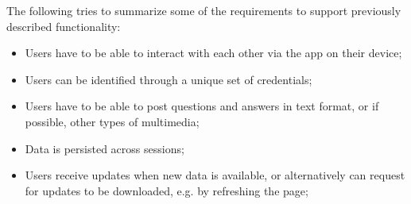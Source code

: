 The following tries to summarize some of the requirements to support previously described functionality:

\begin{itemize}
	\item Users have to be able to interact with each other via the app on their device;
	\item	Users can be identified through a unique set of credentials;
	\item Users have to be able to post questions and answers in text format, or if possible, other types of multimedia;
	\item Data is persisted across sessions;
	\item	Users receive updates when new data is available, or alternatively can request for updates to be downloaded, e.g. by refreshing the page;
\end{itemize}


